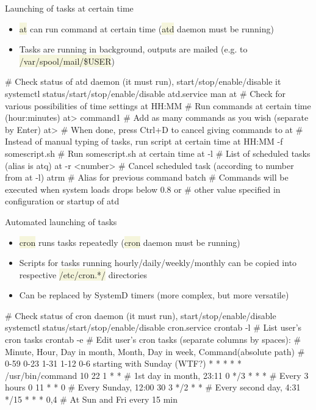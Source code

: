 \documentclass[compress, ucs, xelatex, 11pt, xcolor=svgnames, aspectratio=169,
	hyperref={
		bookmarks=true,
		unicode=true,
		colorlinks=true,
		pdftitle={Linux, command line and MetaCentrum},
		plainpages=false,
		pdfauthor={Vojtech Zeisek},
		pdfsubject={Course about use of Linux command line, writing shell scripts and using MetaCentrum of CESNET},
		pdfcreator={XeLaTeX},
		pdfkeywords={Linux, GNU, BASH, shell, command line, MetaCentrum},
		linkcolor=DarkRed, %
		anchorcolor=DarkBlue, %
		citecolor=Indigo, %
		filecolor=NavyBlue, %
		menucolor=DarkMagenta, %
		urlcolor=DarkBlue, %
		pdftex},
	url={hyphens, lowtilde} %
	]{beamer}
\renewcommand{\texttt}[1]{\colorbox{Beige}{{\ttfamily #1}}}
\begin{document}
\begin{frame}[fragile]{Launching of tasks at certain time}
	\begin{itemize}
		\item \texttt{at} can run command at certain time (\texttt{atd} daemon must be running)
		\item Tasks are running in background, outputs are mailed (e.g. to \texttt{/var/spool/mail/\$USER})
	\end{itemize}
	\vfill
	\begin{bashcode}
    # Check status of atd daemon (it must run), start/stop/enable/disable it
    systemctl status/start/stop/enable/disable atd.service
    man at # Check for various possibilities of time settings
    at HH:MM # Run commands at certain time (hour:minutes)
    at> command1 # Add as many commands as you wish (separate by Enter)
    at> # When done, press Ctrl+D to cancel giving commands to at
    # Instead of manual typing of tasks, run script at certain time
    at HH:MM -f somescript.sh # Run somescript.sh at certain time
    at -l # List of scheduled tasks (alias is atq)
    at -r <number> # Cancel scheduled task (according to number from at -l)
    atrm # Alias for previous command
    batch # Commands will be executed when system loads drops below 0.8 or
          # other value specified in configuration or startup of atd
	\end{bashcode}
\end{frame}

\begin{frame}[fragile]{Automated launching of tasks}
	\begin{itemize}
		\item \texttt{cron} runs tasks repeatedly (\texttt{cron} daemon must be running)
		\item Scripts for tasks running hourly/daily/weekly/monthly can be copied into respective \texttt{/etc/cron.*/} directories
		\item Can be replaced by SystemD timers (more complex, but more versatile)
	\end{itemize}
	\vfill
	\begin{bashcode}
    # Check status of cron daemon (it must run), start/stop/enable/disable
    systemctl status/start/stop/enable/disable cron.service
    crontab -l # List user's cron tasks
    crontab -e # Edit user's cron tasks (separate columns by spaces):
    # Minute, Hour, Day in month, Month, Day in week, Command(absolute path)
    # 0-59    0-23  1-31          1-12   0-6 starting with Sunday (WTF?)
      *       *     *             *      *            /usr/bin/command
      10      22    1             *      *    # 1st day in month, 23:11
      0       */3   *             *      *    # Every 3 hours
      0       11    *             *      0    # Every Sunday, 12:00
      30      3     */2           *      *    # Every second day, 4:31
      */15    *     *             *      0,4  # At Sun and Fri every 15 min
	\end{bashcode}
\end{frame}
\end{document}
